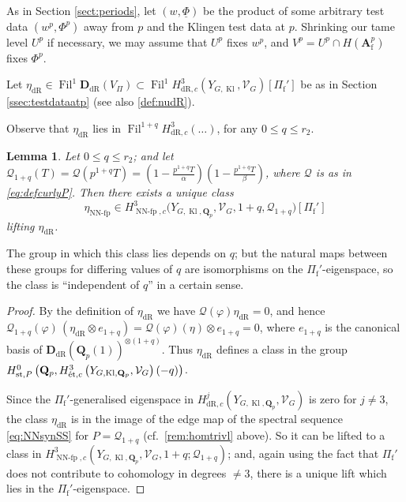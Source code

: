 \documentclass[cjm]{ipart}
\theoremstyle{plain}
\newtheorem{lemma}[theorem]{Lemma}
\theoremstyle{remark}
\DeclareMathOperator{\Fil}{Fil}
\DeclareMathOperator{\Kl}{Kl}
\DeclareMathOperator{\NNfp}{NN-fp}
\DeclareMathOperator{\st}{st}
\newcommand{\Af}{\AA_{\mathrm{f}}}
\newcommand{\DdR}{\mathbf{D}_{\mathrm{dR}}}
\newcommand{\Pif}{\Pi_{\mathrm{f}}}
\newcommand{\QQ}{\mathbf{Q}}
\newcommand{\Qp}{\QQ_p}
\newcommand{\cQ}{\mathcal{Q}}
\newcommand{\cV}{\mathcal{V}}
\newcommand{\dR}{\mathrm{dR}}
\newcommand{\et}{\text{\textup{\'et}}}
\newcommand{\uPhi}{\underline{\Phi}}
\renewcommand{\AA}{\mathbf{A}}
\numberwithin{equation}{subsection}
\renewcommand{\leq}{\leqslant}
\begin{document}
  As in Section \ref{sect:periods}, let $(w,\uPhi)$ be the product of  some arbitrary test data $(w^p, \Phi^p)$ away from $p$ and the Klingen test data at $p$. Shrinking our tame level $U^p$ if necessary, we may assume that $U^p$ fixes $w^p$, and $V^p = U^p \cap H(\Af^p)$ fixes $\Phi^p$.

  Let $\eta_{\dR}\in \Fil^1\DdR(V_\Pi)\subset  \Fil^1 H^3_{\dR, c}(Y_{G, \Kl}, \cV_G)[\Pif']$ be as in Section \ref{ssec:testdataatp} (see also  \cref{def:nudR}).

  \begin{note}
   Observe that $\eta_{\dR}$ lies in $\Fil^{1+q} H^3_{\dR, c}(\dots)$, for any $0\leq q\leq r_2$.
  \end{note}

  \begin{lemma}
   \label{lem:etaNNfp}
   Let $0\leq q\leq r_2$; and let $\cQ_{1+q}(T)=\cQ(p^{1+q} T) = \left(1-\frac{p^{1+q} T}{\alpha}\right)\left(1-\frac{p^{1+q} T}{\beta}\right)$, where $\cQ$ is as in \eqref{eq:defcurlyP}. Then there exists a unique class
   \[ \eta_{\NNfp} \in H^3_{\NNfp,c}\Big(Y_{G,\Kl, \Qp}, \cV_G, 1+q, \cQ_{1+q}\Big)[\Pif'] \]
   lifting $\eta_{\dR}$.
  \end{lemma}

  \begin{note}
   The group in which this class lies depends on $q$; but the natural maps between these groups for differing values of $q$ are isomorphisms on the $\Pif'$-eigenspace, so the class is ``independent of $q$'' in a certain sense.
  \end{note}

  \begin{proof}
   By the definition of $\eta_{\dR}$ we have $\cQ(\varphi)\eta_{\dR} = 0$, and hence $\cQ_{1+q}(\varphi)\,(\eta_{\dR} \otimes e_{1+q}) =\cQ(\varphi)(\eta) \otimes e_{1 + q} = 0$, where $e_{1+q}$ is the canonical basis of $\DdR(\Qp(1))^{\otimes (1+q)}$. Thus $\eta_{\dR}$ defines a class in the group $H^0_{\st, P}\left(\Qp, H^3_{\et, c}\left(Y_{G, \Kl, \Qp}, \cV_G\right)(-q)\right)$.

   Since the $\Pif'$-generalised eigenspace in $H^j_{\dR, c}\left(Y_{G, \Kl, \Qp}, \cV_G \right)$ is zero for $j \ne 3$, the class $\eta_{\dR}$ is in the image of the edge map of the spectral sequence \eqref{eq:NNsynSS} for $P = \cQ_{1+q}$ (cf.~\cref{rem:homtrivl} above). So it can be lifted to a class in $H^3_{\NNfp, c}\left(Y_{G, \Kl, \Qp}, \cV_G, 1+q; \cQ_{1+q}\right)$; and, again using the fact that $\Pif'$ does not contribute to cohomology in degrees $\ne 3$, there is a unique lift which lies in the $\Pif'$-eigenspace.
  \end{proof}
\end{document}
